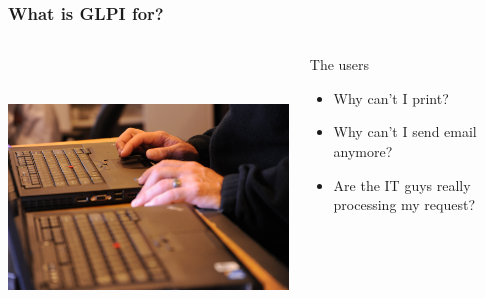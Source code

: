 \documentclass{beamer}
\begin{document}
\begin{frame}
    \frametitle{What is GLPI for?}

 \begin{columns}
 \begin{column}{0.35\textwidth}
         \includegraphics[height=7.5cm]{./pics/lenovo.jpg}
 \end{column}
 \begin{column}{0.65\textwidth}

    \begin{block}{The users}
        \begin{itemize}
            \item Why can't I print?
            \item Why can't I send email anymore?
            \item Are the IT guys really processing my request?
        \end{itemize}
    \end{block}
 \end{column}
\end{columns}

\end{frame}
\end{document}
